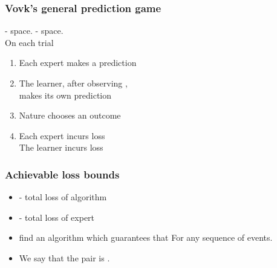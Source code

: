 \documentclass{beamer}
\begin{document}
\begin{frame}
\frametitle{Vovk's general prediction game}
\R{$\Gamma$} -  space.
\R{$\Omega$} -  space. \\
\pause
On each trial 
\pause
\begin{enumerate}
\item
Each expert  makes a prediction 
\item
The learner, after observing , \\
makes its own prediction 
\item
Nature chooses an outcome 
\item
Each expert incurs loss  \\
The learner incurs loss 
\end{enumerate}
\end{frame}

\begin{frame}
\frametitle{Achievable loss bounds}
\begin{itemize}
\item {} - total loss of algorithm
\item {} - total loss of expert 
\item {} find an algorithm which guarantees that 
\R{\[
(a,c) \in [0,\infty),\;\; \TAloss \leq a \BEloss + c \ln N 
\]}
For any sequence of events.
\item We say that the pair  is .
\end{itemize}
\end{frame}
\end{document}
